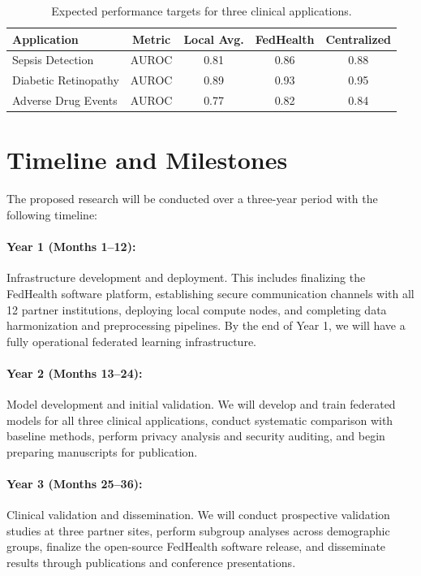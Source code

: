 \documentclass[12pt,letterpaper]{article}
\begin{document}
\begin{table}[H]
\centering
\caption{Expected performance targets for three clinical applications.}
\label{tab:targets}
\begin{tabular}{lcccc}
\hline
\textbf{Application} & \textbf{Metric} & \textbf{Local Avg.} & \textbf{FedHealth} & \textbf{Centralized} \\
\hline
Sepsis Detection & AUROC & 0.81 & 0.86 & 0.88 \\
Diabetic Retinopathy & AUROC & 0.89 & 0.93 & 0.95 \\
Adverse Drug Events & AUROC & 0.77 & 0.82 & 0.84 \\
\hline
\end{tabular}
\end{table}

\section{Timeline and Milestones}
\label{sec:timeline}

The proposed research will be conducted over a three-year period with the following timeline:

\paragraph{Year 1 (Months 1--12):} Infrastructure development and deployment. This includes finalizing the FedHealth software platform, establishing secure communication channels with all 12 partner institutions, deploying local compute nodes, and completing data harmonization and preprocessing pipelines. By the end of Year 1, we will have a fully operational federated learning infrastructure.

\paragraph{Year 2 (Months 13--24):} Model development and initial validation. We will develop and train federated models for all three clinical applications, conduct systematic comparison with baseline methods, perform privacy analysis and security auditing, and begin preparing manuscripts for publication.

\paragraph{Year 3 (Months 25--36):} Clinical validation and dissemination. We will conduct prospective validation studies at three partner sites, perform subgroup analyses across demographic groups, finalize the open-source FedHealth software release, and disseminate results through publications and conference presentations.
\end{document}
